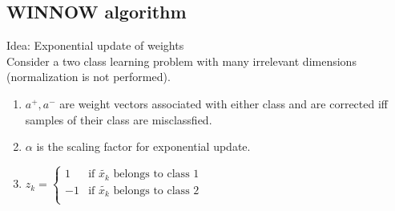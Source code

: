 \documentclass[MachineLearning]{subfiles}
\begin{document}
\subsection{WINNOW algorithm}
Idea: Exponential update of weights\\
Consider a two class learning problem with many irrelevant
dimensions (normalization is not performed).
\begin{enumerate}
\item \(a^+ , a^-\) are weight vectors associated with either class and are corrected iff samples of their class are misclassfied.
\item \(\alpha\) is the scaling factor for exponential update.
\item \(z_k =
\begin{cases}
1 & \mbox{if } \tilde{x_k} \text{ belongs to class 1}\\
-1 & \mbox{if } \tilde{x_k} \text{ belongs to class 2}\\
\end{cases}
\)
\end{enumerate}
\end{document}
